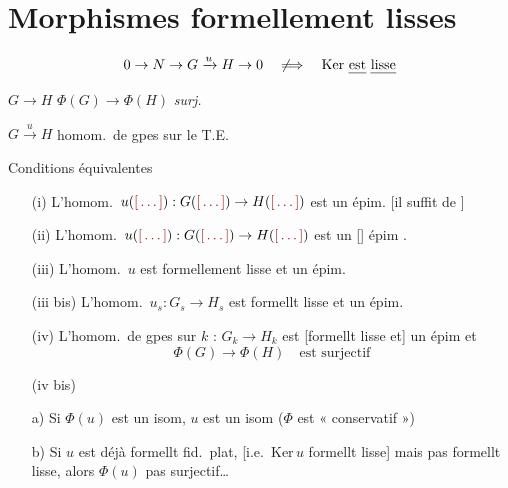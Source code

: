 \documentclass[11pt,a4paper]{article}
\begin{document}

\section{Morphismes formellement lisses}

\[
0 \to N \to G \xrightarrow{u} H \to 0
\quad \not\Longrightarrow \quad
\mathrm{Ker}\ \text{\uncertain{est}}\ \text{\uncertain{lisse}}
\]


$G \to H$ \qquad $\Phi(G) \to \Phi(H)$ \emph{surj.}

$G \xrightarrow{u} H$ homom.\ de gpes  \ill{} sur le
T.E.

Conditions équivalentes
\begin{itemize}
  \item[(i)] L'homom.\ $u(\ill{}) : G(\ill{}) \to H(\ill{})$ est un épim.
  [il suffit de  \ill{}]
  \item[(ii)] L'homom.\ $u(\ill{}) : G(\ill{}) \to H(\ill{})$ est un
  [\ill{}] épim \ill{}.
  \item[(iii)] L'homom.\ $u$ est formellement lisse et un épim.
  \item[(iii bis)] L'homom.\ $u_s : G_s \to H_s$ est formellt lisse et un
  épim.
  \item[(iv)] L'homom.\ de gpes  sur $k$ :
  $G_k \to H_k$ est \struck{\ill{}} [formellt lisse et] un épim et
  \[
  \Phi(G) \to \Phi(H) \quad \text{est surjectif}
  \]
  \item[(iv bis)]
\end{itemize}



\begin{itemize}
  \item[a)] Si $\Phi(u)$ est un isom, \ill{} $u$ est un isom
  ($\Phi$ est « conservatif »)
  \item[b)] Si $u$ est déjà formellt fid.\ plat, \struck{\ill{}} \ill{}
  [i.e.\ $\mathrm{Ker}\, u$  formellt lisse] mais pas
  formellt lisse, alors $\Phi(u)$ pas surjectif…
\end{itemize}
\end{document}
